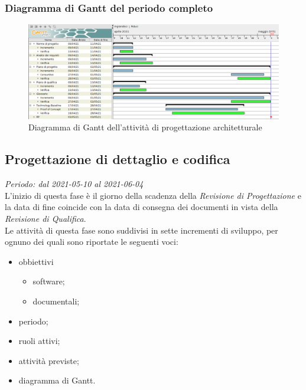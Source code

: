 \subsubsection{Diagramma di Gantt del periodo completo}
\begin{figure}[!ht]
    \caption{Diagramma di Gantt dell'attività di progettazione architetturale}
    \vspace{5px}
    \includegraphics[scale=0.3]{../../../Images/Diagrammi/Gantt/progettArchitetturale_v2.png}
    \centering
\end{figure}

\subsection{Progettazione di dettaglio e codifica}
\textit{Periodo: dal 2021-05-10 al 2021-06-04}\\
L'inizio di questa fase è il giorno della scadenza della \textit{Revisione di Progettazione} e la data di fine coincide con la data di consegna dei documenti in vista della \textit{Revisione di Qualifica}.\\
Le attività di questa fase sono suddivisi in sette incrementi di sviluppo, per ognuno dei quali sono riportate le seguenti voci:
\begin{itemize}
    \item obbiettivi
          \begin{itemize}
              \item software;
              \item documentali;
          \end{itemize}
    \item periodo;
    \item ruoli attivi;
    \item attività previste;
    \item diagramma di Gantt.
\end{itemize}


